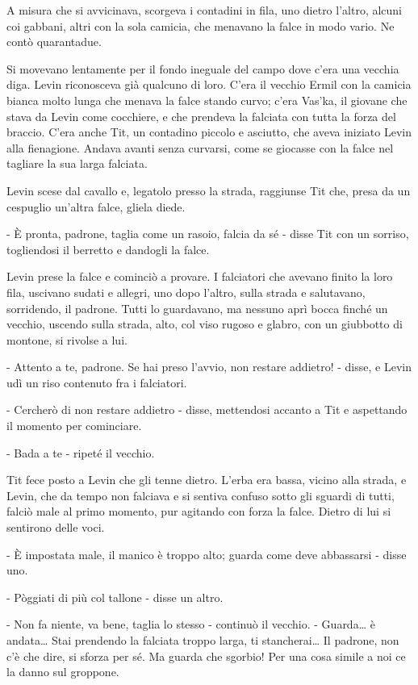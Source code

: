 A misura che si avvicinava, scorgeva i contadini in fila, uno dietro l'altro, alcuni coi gabbani, altri con la sola camicia, che menavano la falce in modo vario. Ne contò quarantadue. 

Si movevano lentamente per il fondo ineguale del campo dove c'era una vecchia diga. Levin riconosceva già qualcuno di loro. C'era il vecchio Ermil con la camicia bianca molto lunga che menava la falce stando curvo; c'era Vas'ka, il giovane che stava da Levin come cocchiere, e che prendeva la falciata con tutta la forza del braccio. C'era anche Tit, un contadino piccolo e asciutto, che aveva iniziato Levin alla fienagione. Andava avanti senza curvarsi, come se giocasse con la falce nel tagliare la sua larga falciata. 

Levin scese dal cavallo e, legatolo presso la strada, raggiunse Tit che, presa da un cespuglio un'altra falce, gliela diede. 

- È pronta, padrone, taglia come un rasoio, falcia da sé - disse Tit con un sorriso, togliendosi il berretto e dandogli la falce. 

Levin prese la falce e cominciò a provare. I falciatori che avevano finito la loro fila, uscivano sudati e allegri, uno dopo l'altro, sulla strada e salutavano, sorridendo, il padrone. Tutti lo guardavano, ma nessuno aprì bocca finché un vecchio, uscendo sulla strada, alto, col viso rugoso e glabro, con un giubbotto di montone, si rivolse a lui. 

- Attento a te, padrone. Se hai preso l'avvio, non restare addietro! - disse, e Levin udì un riso contenuto fra i falciatori. 

- Cercherò di non restare addietro - disse, mettendosi accanto a Tit e aspettando il momento per cominciare. 

- Bada a te - ripeté il vecchio. 

Tit fece posto a Levin che gli tenne dietro. L'erba era bassa, vicino alla strada, e Levin, che da tempo non falciava e si sentiva confuso sotto gli sguardi di tutti, falciò male al primo momento, pur agitando con forza la falce. Dietro di lui si sentirono delle voci. 

- È impostata male, il manico è troppo alto; guarda come deve abbassarsi - disse uno. 

- Pòggiati di più col tallone - disse un altro. 

- Non fa niente, va bene, taglia lo stesso - continuò il vecchio. - Guarda\ldots{} è andata\ldots{} Stai prendendo la falciata troppo larga, ti stancherai\ldots{} Il padrone, non c'è che dire, si sforza per sé. Ma guarda che sgorbio! Per una cosa simile a noi ce la danno sul groppone. 

